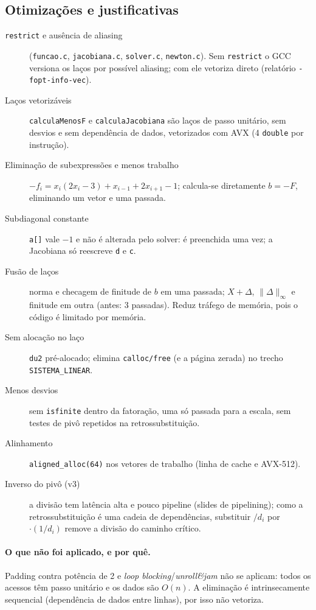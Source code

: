 \documentclass[10pt,a4paper]{article}
\begin{document}
\subsection{Otimizações e justificativas}
\begin{description}
\item[\texttt{restrict} e ausência de aliasing] (\texttt{funcao.c}, \texttt{jacobiana.c}, \texttt{solver.c}, \texttt{newton.c}).
Sem \texttt{restrict} o GCC versiona os laços por possível aliasing; com ele vetoriza direto (relatório \texttt{-fopt-info-vec}).
\item[Laços vetorizáveis] \texttt{calculaMenosF} e \texttt{calculaJacobiana} são laços de passo unitário, sem desvios e sem
dependência de dados, vetorizados com AVX (4 \texttt{double} por instrução).
\item[Eliminação de subexpressões e menos trabalho] $-f_i=x_i(2x_i-3)+x_{i-1}+2x_{i+1}-1$; calcula-se diretamente $b=-F$, eliminando um vetor e uma passada.
\item[Subdiagonal constante] \texttt{a[]} vale $-1$ e não é alterada pelo solver: é preenchida uma vez; a Jacobiana só reescreve \texttt{d} e \texttt{c}.
\item[Fusão de laços] norma e checagem de finitude de $b$ em uma passada; $X+\Delta$, $\|\Delta\|_\infty$ e finitude em outra (antes: 3 passadas). Reduz tráfego de memória, pois o código é limitado por memória.
\item[Sem alocação no laço] \texttt{du2} pré-alocado; elimina \texttt{calloc/free} (e a página zerada) no trecho \texttt{SISTEMA\_LINEAR}.
\item[Menos desvios] sem \texttt{isfinite} dentro da fatoração, uma só passada para a escala, sem testes de pivô repetidos na retrossubstituição.
\item[Alinhamento] \texttt{aligned\_alloc(64)} nos vetores de trabalho (linha de cache e AVX-512).
\item[Inverso do pivô (v3)] a divisão tem latência alta e pouco pipeline (slides de pipelining); como a retrossubstituição é uma cadeia de dependências, substituir $/d_i$ por $\cdot(1/d_i)$ remove a divisão do caminho crítico.
\end{description}
\paragraph{O que não foi aplicado, e por quê.} Padding contra potência de 2 e \emph{loop blocking}/\emph{unroll\&jam}
não se aplicam: todos os acessos têm passo unitário e os dados são $O(n)$. A eliminação é intrinsecamente sequencial
(dependência de dados entre linhas), por isso não vetoriza.
\end{document}
